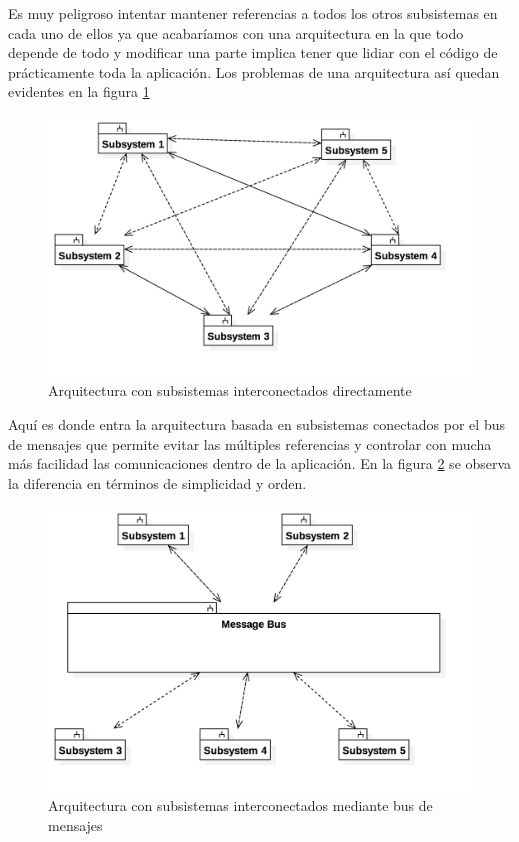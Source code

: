 \bigskip

Es muy peligroso intentar mantener referencias a todos los otros subsistemas en cada uno de ellos ya que acabaríamos con una arquitectura en la que todo depende de todo y modificar una parte implica tener que lidiar con el código de prácticamente toda la aplicación. Los problemas de una arquitectura así quedan evidentes en la figura \ref{dia:arquitectura_mala}

\bigskip

\begin{figure}
	\includegraphics[width=15cm]{otros/UML/png/arquitectura_mala.png}
	\caption{Arquitectura con subsistemas interconectados directamente}
	\label{dia:arquitectura_mala}
\end{figure}

\bigskip

Aquí es donde entra la arquitectura basada en subsistemas conectados por el bus de mensajes que permite evitar las múltiples referencias y controlar con mucha más facilidad las comunicaciones dentro de la aplicación. En la figura \ref{dia:arquitectura_general} se observa la diferencia en términos de simplicidad y orden.

\bigskip

\begin{figure}
	\includegraphics[width=15cm]{otros/UML/png/arquitectura_general.png}
	\caption{Arquitectura con subsistemas interconectados mediante bus de mensajes}
	\label{dia:arquitectura_general}
\end{figure}

